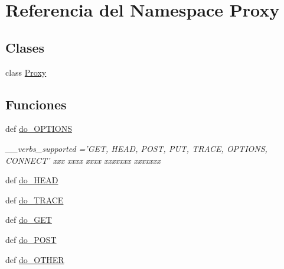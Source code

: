 \hypertarget{namespace_proxy}{\section{Referencia del Namespace Proxy}
\label{namespace_proxy}
}
\subsection*{Clases}
\begin{DoxyCompactItemize}
\item 
class \hyperlink{class_proxy_1_1_proxy}{Proxy}
\end{DoxyCompactItemize}
\subsection*{Funciones}
\begin{DoxyCompactItemize}
\item 
def \hyperlink{namespace_proxy_aef58a1f8870767a90fcd50fe3f608f3c}{do\-\_\-\-O\-P\-T\-I\-O\-N\-S}
\begin{DoxyCompactList}\small\item\em \-\_\-\-\_\-verbs\-\_\-supported ='G\-E\-T, H\-E\-A\-D, P\-O\-S\-T, P\-U\-T, T\-R\-A\-C\-E, O\-P\-T\-I\-O\-N\-S, C\-O\-N\-N\-E\-C\-T' xxx xxxx xxxx xxxxxxx xxxxxxx \end{DoxyCompactList}\item 
def \hyperlink{namespace_proxy_a6b3c98b218b9f93497e6904d2b38dc9a}{do\-\_\-\-H\-E\-A\-D}
\item 
def \hyperlink{namespace_proxy_a5b338e47e1b0e9cb39567e0889821505}{do\-\_\-\-T\-R\-A\-C\-E}
\item 
def \hyperlink{namespace_proxy_a0b28bfc4e90ada34208df3f8aa0c35b4}{do\-\_\-\-G\-E\-T}
\item 
def \hyperlink{namespace_proxy_a01ffd6241674f75151672dd0510f9f32}{do\-\_\-\-P\-O\-S\-T}
\item 
def \hyperlink{namespace_proxy_a68c74661fb7b7d5a4cf291e22ca18990}{do\-\_\-\-O\-T\-H\-E\-R}
\end{DoxyCompactItemize}
